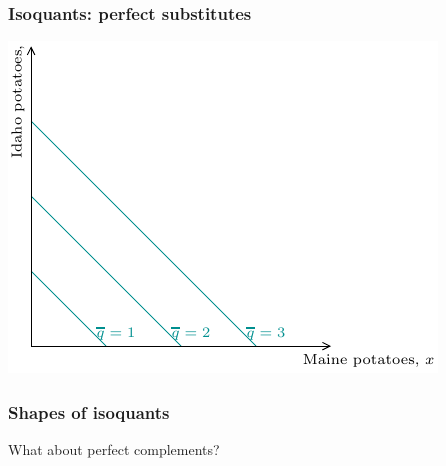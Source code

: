 \documentclass[xcolor=pdftex,dvipsnames]{beamer}
\begin{document}
\begin{frame}
\frametitle{Isoquants: perfect substitutes}
\begin{center}
\includegraphics{pics/PerfSub}
\end{center}
\end{frame}


\begin{frame}
\frametitle{Shapes of isoquants}
What about perfect complements? \bigskip



\end{frame}
\end{document}

